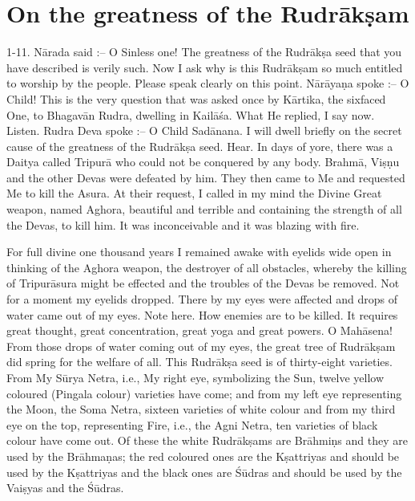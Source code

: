 \chapter{On the greatness of the Rudr\=ak\d{s}am}

1-11. N\=arada said :-- O Sinless one! The greatness of the Rudr\=ak\d{s}a seed that you have described is verily such. Now I ask why is this Rudr\=ak\d{s}am so much entitled to worship by the people. Please speak clearly on this point. N\=ar\=aya\d{n}a spoke :-- O Child! This is the very question that was asked once by K\=artika, the sixfaced One, to Bhagav\=an Rudra, dwelling in Kail\=a\'sa. What He replied, I say now. Listen. Rudra Deva spoke :-- O Child Sad\=anana. I will dwell briefly on the secret cause of the greatness of the Rudr\=ak\d{s}a seed. Hear. In days of yore, there was a Daitya called Tripur\=a who could not be conquered by any body. Brahm\=a, Vi\d{s}\d{n}u and the other Devas were defeated by him. They then came to Me and requested Me to kill the Asura. At their request, I called in my mind the Divine Great weapon, named Aghora, beautiful and terrible and containing the strength of all the Devas, to kill him. It was inconceivable and it was blazing with fire.

For full divine one thousand years I remained awake with eyelids wide open in thinking of the Aghora weapon, the destroyer of all obstacles, whereby the killing of Tripur\=asura might be effected and the troubles of the Devas be removed. Not for a moment my eyelids dropped. There by my eyes were affected and drops of water came out of my eyes. Note here. How enemies are to be killed. It requires great thought, great concentration, great yoga and great powers. O Mah\=asena! From those drops of water coming out of my eyes, the great tree of Rudr\=ak\d{s}am did spring for the welfare of all. This Rudr\=ak\d{s}a seed is of thirty-eight varieties. From My S\=urya Netra, i.e., My right eye, symbolizing the Sun, twelve yellow coloured (Pingala colour) varieties have come; and from my left eye representing the Moon, the Soma Netra, sixteen varieties of white colour and from my third eye on the top, representing Fire, i.e., the Agni Netra, ten varieties of black colour have come out. Of these the white Rudr\=ak\d{s}ams are Br\=ahmi\d{n}s and they are used by the Br\=ahma\d{n}as; the red coloured ones are the K\d{s}attriyas and should be used by the K\d{s}attriyas and the black ones are \'S\=udras and should be used by the Vai\d{s}yas and the \'S\=udras.

